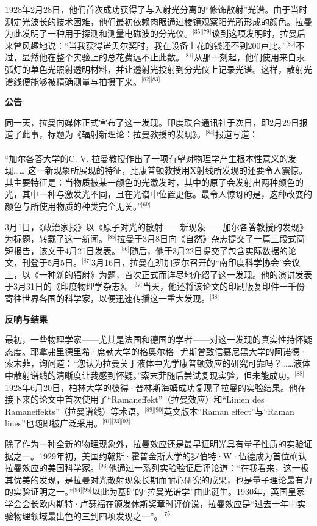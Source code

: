 1928年2月28日，他们首次成功获得了与入射光分离的“修饰散射”光谱。由于当时测定光波长的技术困难，他们最初依赖肉眼通过棱镜观察阳光所形成的颜色。拉曼为此发明了一种用于探测和测量电磁波的分光仪。\(^\text{[35][79]}\)谈到这项发明时，拉曼后来曾风趣地说：“当我获得诺贝尔奖时，我在设备上花的钱还不到200卢比。”\(^\text{[80]}\)不过，显然他在整个实验上的总花费远不止此数。\(^\text{[81]}\)从那一刻起，他们使用来自汞弧灯的单色光照射透明材料，并让透射光投射到分光仪上记录光谱。这样，散射光谱线便能够被精确测量与拍摄下来。\(^\text{[82][83]}\)

\textbf{公告}

同一天，拉曼向媒体正式宣布了这一发现。印度联合通讯社于次日，即2月29日报道了此事，标题为《辐射新理论：拉曼教授的发现》。\(^\text{[84]}\)报道写道：\\\\

“加尔各答大学的C. V. 拉曼教授作出了一项有望对物理学产生根本性意义的发现……
这一新现象所展现的特征，比康普顿教授用X射线所发现的还要令人震惊。其主要特征是：当物质被某一颜色的光激发时，其中的原子会发射出两种颜色的光，其中一种与激发光不同，且在光谱中位置更低。最令人惊讶的是，这种改变的颜色与所使用物质的种类完全无关。”\(^\text{[69]}\)

3月1日，《政治家报》以《原子对光的散射——新现象——加尔各答教授的发现》为标题，转载了这一新闻。\(^\text{[85]}\)拉曼于3月8日向《自然》杂志提交了一篇三段式简短报告，该文于4月21日发表。\(^\text{[86]}\)随后，他于3月22日提交了包含实际数据的论文，刊登于5月5日。\(^\text{[87]}\)3月16日，拉曼在班加罗尔召开的“南印度科学协会”会议上，以《一种新的辐射》为题，首次正式而详尽地介绍了这一发现。他的演讲发表于3月31日的《印度物理学杂志》。\(^\text{[37]}\)当天，他还将该论文的印刷版复印件一千份寄往世界各国的科学家，以便迅速传播这一重大发现。\(^\text{[38]}\)

\textbf{反响与结果}

最初，一些物理学家——尤其是法国和德国的学者——对这一发现的真实性持怀疑态度。耶拿弗里德里希·席勒大学的格奥尔格·尤斯曾致信慕尼黑大学的阿诺德·索末菲，询问道：“您认为拉曼关于液体中光学康普顿效应的研究可靠吗？……液体中散射谱线的清晰度让我感到怀疑。”索末菲随后尝试复现实验，但未能成功。\(^\text{[88]}\)1928年6月20日，柏林大学的彼得·普林斯海姆成功复现了拉曼的实验结果。他在接下来的论文中首次使用了“Ramaneffekt”（拉曼效应）和“Linien des Ramaneffekts”（拉曼谱线）等术语。\(^\text{[89][90]}\)英文版本“Raman effect”与“Raman lines”也随即被广泛采用。\(^\text{[91][23][92]}\)

除了作为一种全新的物理现象外，拉曼效应还是最早证明光具有量子性质的实验证据之一。1929年初，美国约翰斯·霍普金斯大学的罗伯特·W·伍德成为首位确认拉曼效应的美国科学家。\(^\text{[93]}\)他通过一系列实验验证后评论道：“在我看来，这一极其优美的发现，是拉曼对光散射现象长期而耐心研究的成果，也是量子理论最有力的实验证明之一。”\(^\text{[94][95]}\)以此为基础的“拉曼光谱学”由此诞生。1930年，英国皇家学会会长欧内斯特·卢瑟福在颁发休斯奖章时评价说，拉曼效应是“过去十年中实验物理领域最出色的三到四项发现之一”。\(^\text{[75]}\)


